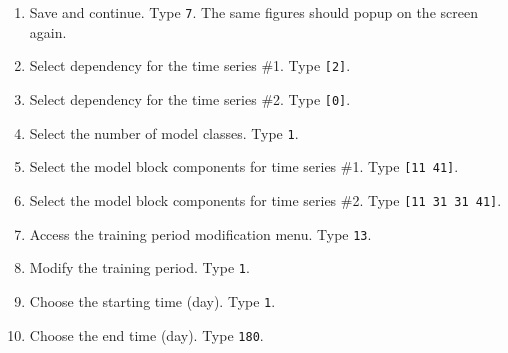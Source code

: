 \begin{enumerate}
\item Save and continue. Type \colorbox{light-gray}{\lstinline[basicstyle = \mlttfamily \small, backgroundcolor = \color{light-gray}]!7!}. The same figures should popup on the screen again.
\item Select dependency for the time series \#1. Type \colorbox{light-gray}{\lstinline[basicstyle = \mlttfamily \small, backgroundcolor = \color{light-gray}]![2]!}.
\item Select dependency for the time series \#2. Type \colorbox{light-gray}{\lstinline[basicstyle = \mlttfamily \small, backgroundcolor = \color{light-gray}]![0]!}.
\item Select the number of model classes. Type \colorbox{light-gray}{\lstinline[basicstyle = \mlttfamily \small, backgroundcolor = \color{light-gray}]!1!}. 
\item Select the model block components for time series \#1. Type \colorbox{light-gray}{\lstinline[basicstyle = \mlttfamily \small, backgroundcolor = \color{light-gray}]![11 41]!}.
\item Select the model block components for time series \#2. Type \colorbox{light-gray}{\lstinline[basicstyle = \mlttfamily \small, backgroundcolor = \color{light-gray}]![11 31 31 41]!}.

\item Access the training period modification menu. Type \colorbox{light-gray}{\lstinline[basicstyle = \mlttfamily \small, backgroundcolor = \color{light-gray}]!13!}. 

\item Modify the training period. Type \colorbox{light-gray}{\lstinline[basicstyle = \mlttfamily \small, backgroundcolor = \color{light-gray}]!1!}. 

\item Choose the starting time (day). Type \colorbox{light-gray}{\lstinline[basicstyle = \mlttfamily \small, backgroundcolor = \color{light-gray}]!1!}. 

\item Choose the end time (day). Type \colorbox{light-gray}{\lstinline[basicstyle = \mlttfamily \small, backgroundcolor = \color{light-gray}]!180!}. 


\end{enumerate}
